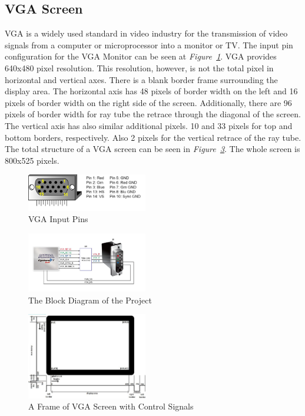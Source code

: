\documentclass[paper]{IEEEtran}
\begin{document}
\subsection{VGA Screen} \- \indent
VGA is a widely used standard in video industry for the transmission of video signals from a computer or microprocessor into a monitor or TV. The input pin configuration for the VGA Monitor can be seen at \textit{Figure~\ref{fig:vga_pins}}. VGA provides 640x480 pixel resolution. This resolution, however, is not the total pixel in horizontal and vertical axes. There is a blank border frame surrounding the display area. The horizontal axis has 48 pixels of border width on the left and 16 pixels of border width on the right side of the screen. Additionally, there are 96 pixels of border width for ray tube the retrace through the diagonal of the screen. The vertical axis has also similar additional pixels. 10 and 33 pixels for top and bottom borders, respectively. Also 2 pixels for the vertical retrace of the ray tube. The total structure of a VGA screen can be seen in \textit{Figure~\ref{fig:vga-hsync-vsync}}. The whole screen is 800x525 pixels.

\begin{figure}[h!]
	\setlength{\unitlength}{\textwidth}
	\center 
	\includegraphics[width=0.47\textwidth]{vgapins}
	\caption{\label{fig:vga_pins} VGA Input Pins}
\end{figure}


\begin{figure}[h!]
	\setlength{\unitlength}{\textwidth}
	\center 
	\includegraphics[width=0.47\textwidth]{VGAconfig}
	\caption{\label{fig:VGA_config}The Block Diagram of the Project}
\end{figure}

\begin{figure}[h!]
	\setlength{\unitlength}{\textwidth}
	\center 
	\includegraphics[width=0.47\textwidth]{vga-hsync-vsync}
	\caption{\label{fig:vga-hsync-vsync}A Frame of VGA Screen with Control Signals}
\end{figure}
\end{document}
